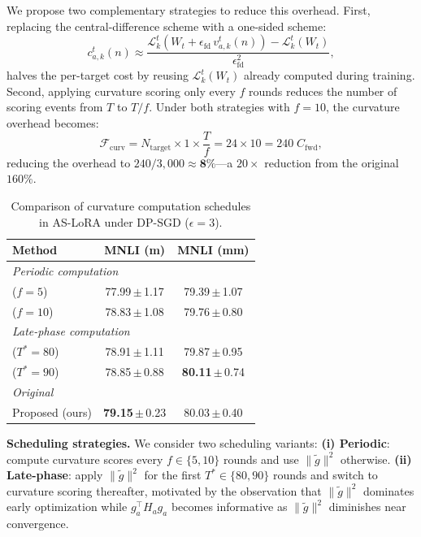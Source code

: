 We propose two complementary strategies to reduce this overhead.
First, replacing the central-difference scheme with a one-sided scheme:
\[
c_{a,k}^t(n) \approx 
\frac{\mathcal{L}_k^t(W_t + \epsilon_{\mathrm{fd}}\,v_{a,k}^t(n)) 
- \mathcal{L}_k^t(W_t)}{\epsilon_{\mathrm{fd}}^2},
\]
halves the per-target cost by reusing $\mathcal{L}_k^t(W_t)$ 
already computed during training.
Second, applying curvature scoring only every $f$ rounds reduces 
the number of scoring events from $T$ to $T/f$.
Under both strategies with $f=10$, the curvature overhead becomes:
\[
\mathcal{F}_{\mathrm{curv}} = N_{\mathrm{target}} \times 1 \times \frac{T}{f}
= 24 \times 10 = 240\;C_{\mathrm{fwd}},
\]
reducing the overhead to $240 / 3{,}000 \approx \mathbf{8\%}$---a 
$20\times$ reduction from the original $160\%$.

\begin{table}
\vspace{-13pt}
\centering
\scriptsize
\setlength{\tabcolsep}{2pt}
\renewcommand{\arraystretch}{1.05}
\newcommand{\std}[1]{\,{\tiny$\pm$}\,\tiny #1}
\caption{
    Comparison of curvature computation schedules in AS-LoRA under DP-SGD ($\epsilon=3$).
}
\label{app:scheduling}
\begin{tabular}{lcc}
\toprule
\textbf{Method} & \textbf{MNLI (m)} & \textbf{MNLI (mm)} \\
\midrule
\multicolumn{3}{l}{\textit{Periodic computation}} \\
($f{=}5$)   & 77.99\std{1.17} & 79.39\std{1.07} \\
($f{=}10$)  & 78.83\std{1.08} & 79.76\std{0.80} \\
\midrule
\multicolumn{3}{l}{\textit{Late-phase computation}} \\
($T^*{=}80$) & 78.91\std{1.11} & 79.87\std{0.95} \\
($T^*{=}90$) & 78.85\std{0.88} & \textbf{80.11}\std{0.74} \\
\midrule
\multicolumn{3}{l}{\textit{Original}} \\
Proposed (ours) & \textbf{79.15}\std{0.23} & 80.03\std{0.40} \\
\bottomrule
\end{tabular}
\vspace{-3pt}
\end{table}

\textbf{Scheduling strategies.}
We consider two scheduling variants:
\textbf{(i) Periodic}: compute curvature scores every $f \in \{5, 10\}$ 
rounds and use $\|\tilde{g}\|^2$ otherwise.
\textbf{(ii) Late-phase}: apply $\|\tilde{g}\|^2$ for the first 
$T^* \in \{80, 90\}$ rounds and switch to curvature scoring thereafter, 
motivated by the observation that $\|\tilde{g}\|^2$ dominates early 
optimization while $g_a^\top H_a g_a$ becomes informative as 
$\|\tilde{g}\|^2$ diminishes near convergence.


